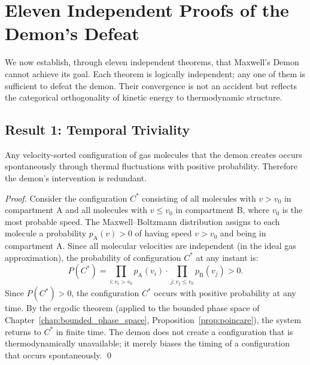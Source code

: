 \section{Eleven Independent Proofs of the Demon's Defeat}
\label{sec:eleven_proofs}

We now establish, through eleven independent theorems, that Maxwell's Demon
cannot achieve its goal. Each theorem is logically independent; any one of them
is sufficient to defeat the demon. Their convergence is not an accident but
reflects the categorical orthogonality of kinetic energy to thermodynamic structure.

\subsection{Result 1: Temporal Triviality}

\begin{theorem}
\label{thm:temporal_triviality}
Any velocity-sorted configuration of gas molecules that the demon creates
occurs spontaneously through thermal fluctuations with positive probability.
Therefore the demon's intervention is redundant.
\end{theorem}

\begin{proof}
Consider the configuration $C^*$ consisting of all molecules with $v > v_0$
in compartment A and all molecules with $v \leq v_0$ in compartment B, where
$v_0$ is the most probable speed. The Maxwell--Boltzmann distribution assigns
to each molecule a probability $p_{\mathrm{A}}(v) > 0$ of having speed $v > v_0$
and being in compartment A. Since all molecular velocities are independent (in
the ideal gas approximation), the probability of configuration $C^*$ at any
instant is:
\begin{equation}
  P(C^*) = \prod_{i: v_i > v_0} p_{\mathrm{A}}(v_i) \cdot \prod_{j: v_j \leq v_0} p_{\mathrm{B}}(v_j) > 0.
\end{equation}
Since $P(C^*) > 0$, the configuration $C^*$ occurs with positive probability at
any time. By the ergodic theorem (applied to the bounded phase space of
Chapter~\ref{chap:bounded_phase_space}, Proposition~\ref{prop:poincare}), the
system returns to $C^*$ in finite time. The demon does not create a configuration
that is thermodynamically unavailable; it merely biases the timing of a configuration
that occurs spontaneously. \qed
\end{proof}

